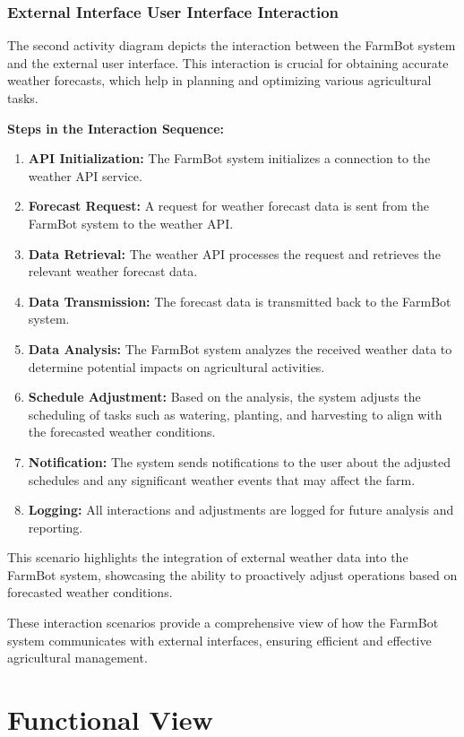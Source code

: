 \subsubsection{External Interface User Interface Interaction}

The second activity diagram depicts the interaction between the FarmBot system and the external user interface. This interaction is crucial for obtaining accurate weather forecasts, which help in planning and optimizing various agricultural tasks.

\textbf{Steps in the Interaction Sequence:}
\begin{enumerate}
    \item \textbf{API Initialization:} The FarmBot system initializes a connection to the weather API service.
    \item \textbf{Forecast Request:} A request for weather forecast data is sent from the FarmBot system to the weather API.
    \item \textbf{Data Retrieval:} The weather API processes the request and retrieves the relevant weather forecast data.
    \item \textbf{Data Transmission:} The forecast data is transmitted back to the FarmBot system.
    \item \textbf{Data Analysis:} The FarmBot system analyzes the received weather data to determine potential impacts on agricultural activities.
    \item \textbf{Schedule Adjustment:} Based on the analysis, the system adjusts the scheduling of tasks such as watering, planting, and harvesting to align with the forecasted weather conditions.
    \item \textbf{Notification:} The system sends notifications to the user about the adjusted schedules and any significant weather events that may affect the farm.
    \item \textbf{Logging:} All interactions and adjustments are logged for future analysis and reporting.
\end{enumerate}

This scenario highlights the integration of external weather data into the FarmBot system, showcasing the ability to proactively adjust operations based on forecasted weather conditions.

These interaction scenarios provide a comprehensive view of how the FarmBot system communicates with external interfaces, ensuring efficient and effective agricultural management.

\section{Functional View}

